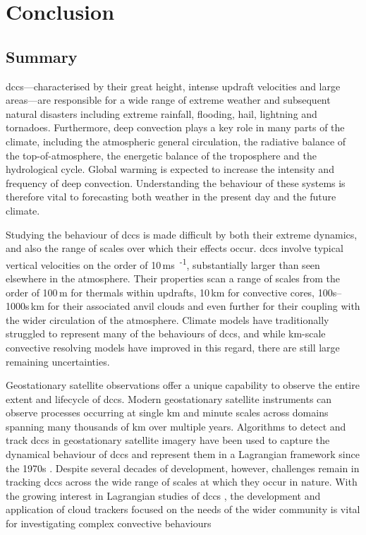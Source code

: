 \chapter{Conclusion} \label{chp:conclusion}

\section{Summary}

\acrshort{dcc}s---characterised by their great height, intense updraft velocities and large areas---are responsible for a wide range of extreme weather and subsequent natural disasters including extreme rainfall, flooding, hail, lightning and tornadoes. 
Furthermore, deep convection plays a key role in many parts of the climate, including the atmospheric general circulation, the radiative balance of the top-of-atmosphere, the energetic balance of the troposphere and the hydrological cycle. 
Global warming is expected to increase the intensity and frequency of deep convection.
Understanding the behaviour of these systems is therefore vital to forecasting both weather in the present day and the future climate.

Studying the behaviour of \acrshort{dcc}s is made difficult by both their extreme dynamics, and also the range of scales over which their effects occur. 
\acrshort{dcc}s involve typical vertical velocities on the order of 10\,\unit{ms\textsuperscript{-1}}, substantially larger than seen elsewhere in the atmosphere. 
Their properties scan a range of scales from the order of 100\,\unit{m} for thermals within updrafts, 10\,\unit{km} for convective cores, 100s--1000s\,\unit{km} for their associated anvil clouds and even further for their coupling with the wider circulation of the atmosphere. 
Climate models have traditionally struggled to represent many of the behaviours of \acrshort{dcc}s, and while km-scale convective resolving models have improved in this regard, there are still large remaining uncertainties.

Geostationary satellite observations offer a unique capability to observe the entire extent and lifecycle of \acrshort{dcc}s. 
Modern geostationary satellite instruments can observe processes occurring at single km and minute scales across domains spanning many thousands of km over multiple years. 
Algorithms to detect and track \acrshort{dcc}s in geostationary satellite imagery have been used to capture the dynamical behaviour of \acrshort{dcc}s and represent them in a Lagrangian framework since the 1970s \citep{menzel_cloud_2001}. 
Despite several decades of development, however, challenges remain in tracking \acrshort{dcc}s across the wide range of scales at which they occur in nature.
With the growing interest in Lagrangian studies of \acrshort{dcc}s \citep{sokol_tropical_2020, gasparini_what_2019, bouniol_life_2021}, the development and application of cloud trackers focused on the needs of the wider community is vital for investigating complex convective behaviours \citep{gasparini_opinion_2023}

